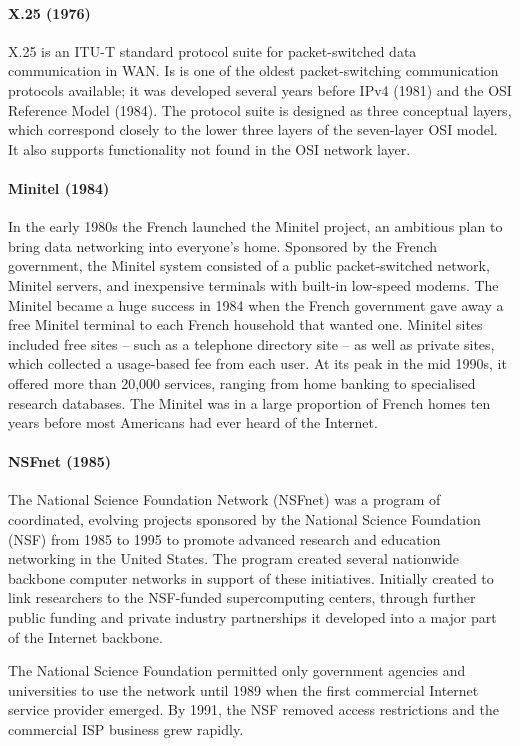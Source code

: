 {\paragraph{X.25 (1976)}
X.25 is an ITU-T standard protocol suite for packet-switched data communication in WAN.
Is is one of the oldest packet-switching communication protocols available; it was developed several years before IPv4 (1981) and the OSI Reference Model (1984).
The protocol suite is designed as three conceptual layers, which correspond closely to the lower three layers of the seven-layer OSI model.
It also supports functionality not found in the OSI network layer.

\paragraph{Minitel (1984)}
In the early 1980s the French launched the Minitel project, an ambitious plan to bring data networking into everyone’s home.
Sponsored by the French government, the Minitel system consisted of a public packet-switched network, Minitel servers, and inexpensive terminals with built-in low-speed modems.
The Minitel became a huge success in 1984 when the French government gave away a free Minitel terminal to each French household that wanted one.
Minitel sites included free sites -- such as a telephone directory site -- as well as private sites, which collected a usage-based fee from each user.
At its peak in the mid 1990s, it offered more than 20,000 services, ranging from home banking to specialised research databases.
The Minitel was in a large proportion of French homes ten years before most Americans had ever heard of the Internet.

\paragraph{NSFnet (1985)}
The National Science Foundation Network (NSFnet) was a program of coordinated, evolving projects sponsored by the National Science Foundation (NSF) from 1985 to 1995 to promote advanced research and education networking in the United States.
The program created several nationwide backbone computer networks in support of these initiatives.
Initially created to link researchers to the NSF-funded supercomputing centers, through further public funding and private industry partnerships it developed into a major part of the Internet backbone.

The National Science Foundation permitted only government agencies and universities to use the network until 1989 when the first commercial Internet service provider emerged.
By 1991, the NSF removed access restrictions and the commercial ISP business grew rapidly.

}
